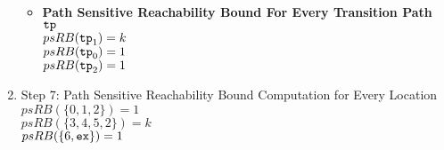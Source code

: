 \begin{example}
\begin{enumerate}
\begin{itemize}
    \item \textbf{Path Sensitive Reachability Bound For Every Transition Path $\mathtt{tp}$ }
    \\
    $psRB(\mathtt{tp}_1) = k$
\\
    $psRB(\mathtt{tp}_0) = 1$ \\
    $psRB(\mathtt{tp}_2) = 1$ 
  \end{itemize}
  \item Step 7: Path Sensitive Reachability Bound Computation for Every Location
  \\
  $psRB(\{0, 1, 2\}) = 1$ \\
  $psRB(\{3, 4, 5, 2 \}) = k$
   \\
  $psRB(\{6, \mathtt{ex}\}) = 1$
  \end{enumerate}
  \end{example}